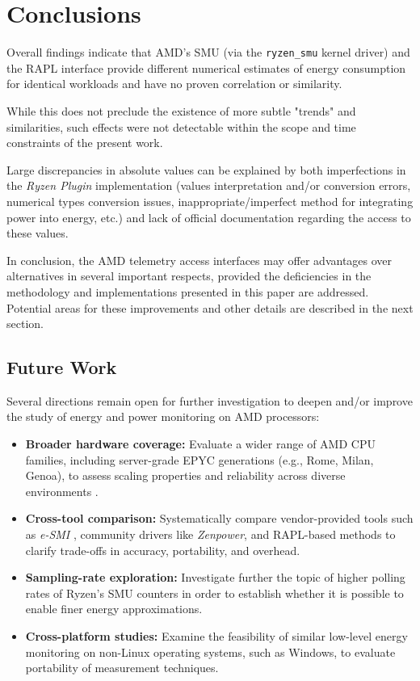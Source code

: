 \section{Conclusions}
\label{sec:conclusions}

Overall findings indicate that AMD’s \gls{SMU} (via the \texttt{ryzen\_smu}
kernel driver) and the \gls{RAPL} interface provide different numerical
estimates of energy consumption for identical workloads and have no proven
correlation or similarity.

While this does not preclude the existence of more subtle "trends" and
similarities, such effects were not detectable within the scope and time
constraints of the present work.

Large discrepancies in absolute values can be explained by both imperfections
in the \emph{Ryzen Plugin} implementation (values interpretation and/or conversion
errors, numerical types conversion issues, inappropriate/imperfect method for
integrating power into energy, etc.) and lack of official documentation regarding
the access to these values.

In conclusion, the  AMD telemetry access interfaces may offer advantages over 
alternatives in several important respects, provided the deficiencies in the
methodology and implementations presented in this paper are addressed.
Potential areas for these improvements and other details are described in the
next section.

\subsection{Future Work}

Several directions remain open for further investigation to
deepen and/or improve the study of energy and power monitoring on
AMD processors:

\begin{itemize}
  \item \textbf{Broader hardware coverage:} Evaluate a wider range of AMD
        \gls{CPU} families, including server-grade EPYC generations
        (e.g., Rome, Milan, Genoa), to assess scaling properties and reliability across diverse environments \parencite{hackenberg2019epyc}.
  \item \textbf{Cross-tool comparison:} Systematically compare vendor-provided
        tools such as \textit{e-SMI} \parencite{amd2022esmi}, community
        drivers like \textit{Zenpower}, and \gls{RAPL}-based methods to
        clarify trade-offs in accuracy, portability, and overhead.
  \item \textbf{Sampling-rate exploration:} Investigate further the topic
        of higher polling rates of Ryzen’s \gls{SMU} counters in order
        to establish whether it is possible to enable finer energy
        approximations.
  \item \textbf{Cross-platform studies:} Examine the feasibility of similar
        low-level energy monitoring on non-Linux operating systems, such as
        Windows, to evaluate portability of measurement techniques.
\end{itemize}

